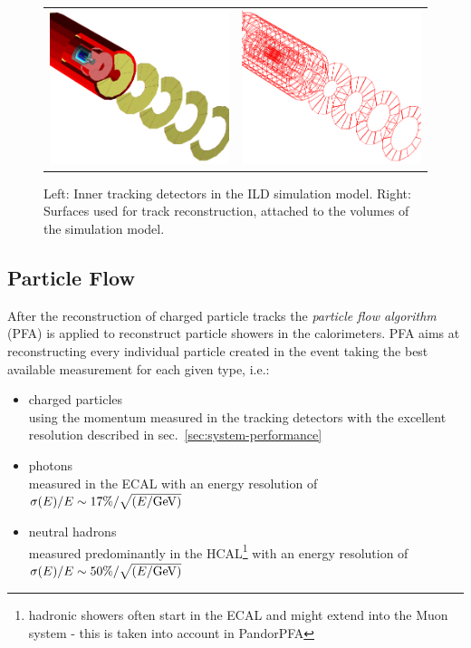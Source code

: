 \begin{figure}[b!]
\begin{tabular}{cc}
\includegraphics[width=0.5\hsize]{Modelling/fig/ild_inner_trackers.png} &
\includegraphics[width=0.5\hsize]{Modelling/fig/ild_inner_trackers_surfaces.png}
\end{tabular}
\caption{\label{fig:inner_trk_surfaces} Left: Inner tracking detectors in the ILD simulation model.
  Right: Surfaces used for track reconstruction, attached to the volumes of the simulation model.}
\end{figure}

\subsection{Particle Flow}

After the reconstruction of charged particle tracks the  \emph{particle flow algorithm} (PFA) is applied
to reconstruct particle showers in the calorimeters.  PFA aims at reconstructing every individual particle
created in the event taking the best available measurement for each given type, i.e.:
\begin{itemize}
\item charged particles\\
  using the momentum measured in the tracking detectors with the excellent resolution described in sec.~\ref{sec:system-performance}
\item photons\\
  measured in the ECAL with an energy resolution of $\sigma(E)/E \sim  17\% / \sqrt{(E/\rm{GeV})}$
\item neutral hadrons\\
  measured predominantly in the HCAL\footnote{hadronic showers often start in the ECAL and might extend into the Muon system -
    this is taken into account in PandorPFA} with an energy resolution of $\sigma(E)/E \sim  50\% / \sqrt{(E/\rm{GeV})}$ %
\end{itemize}

